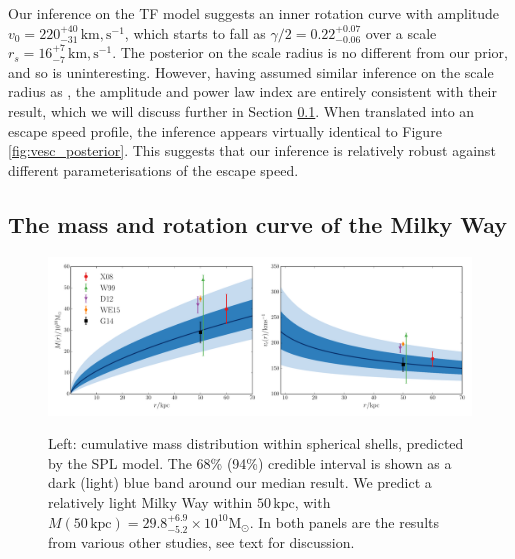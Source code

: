 \documentclass[useAMS,twocolumn,usenatbib]{mn2e}
\def\kpc{{\,\mathrm{kpc}}}
\def\km,s{{\,\mathrm{km,s^{-1}}}}
\begin{document}
Our inference on the TF model suggests an inner rotation curve with amplitude $v_0 = 220^{+40}_{-31}\km,s$, which starts to fall as $\gamma/2 = 0.22^{+0.07}_{-0.06}$ over a scale $r_s = 16^{+7}_{-7}\km,s$. 
The posterior on the scale radius is no different from our prior, and so is uninteresting. 
However, having assumed similar inference on the scale radius as \citet{Gi14}, the amplitude and power law index are entirely consistent with their result, which we will discuss further in Section \ref{sec:mass}. 
When translated into an escape speed profile, the inference appears virtually identical to Figure \ref{fig:vesc_posterior}. 
This suggests that our inference is relatively robust against different parameterisations of the escape speed.

\subsection{The mass and rotation curve of the Milky Way}
\label{sec:mass}

\begin{figure}
\includegraphics[width=2\columnwidth]{plots/spherical_powerlaw_massenclosed}\\
\caption{Left: cumulative mass distribution within spherical shells, predicted by the SPL model. 
The 68\% (94\%) credible interval is shown as a dark (light) blue band around our median result. 
We predict a relatively light Milky Way within $50\kpc$, with $M(50\kpc)=29.8^{+6.9}_{-5.2} \times 10^{10}\mathrm{M}_\odot$. 
In both panels are the results from various other studies, see text for discussion.}
\label{fig:mass}
\end{figure}

\end{document}
